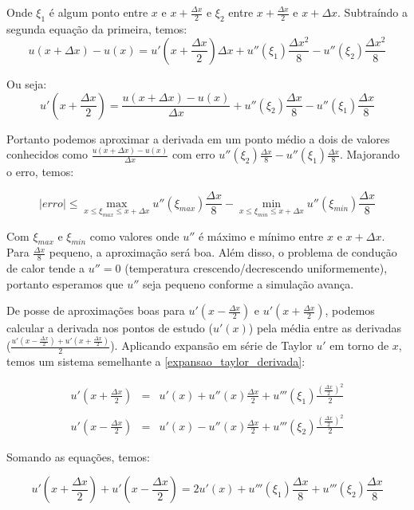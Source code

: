 \documentclass[12pt,fleqn]{article}
\begin{document}
Onde $\xi_1$ é algum ponto entre $x$ e $x + \frac{\Delta x}{2}$ e $\xi_2$ entre $x + \frac{\Delta x}{2}$ e $x + \Delta x$. Subtraíndo a segunda equação da primeira, temos:
\[u(x + \Delta x) - u(x) = u'(x + \frac{\Delta x}{2}) \Delta x + u''(\xi_1) \frac{\Delta x ^ 2}{8} - u''(\xi_2) \frac{\Delta x ^ 2}{8}\]

Ou seja:
\[u'(x + \frac{\Delta x}{2}) = \frac{u(x + \Delta x) - u(x)}{\Delta x} + u''(\xi_2) \frac{\Delta x}{8} - u''(\xi_1) \frac{\Delta x}{8}\]

Portanto podemos aproximar a derivada em um ponto médio a dois de valores conhecidos como $\frac{u(x + \Delta x) - u(x)}{\Delta x}$ com erro $u''(\xi_2) \frac{\Delta x}{8} - u''(\xi_1) \frac{\Delta x}{8}$. Majorando o erro, temos:

\[|erro| \leq \max_{x \leq \xi_{max} \leq x + \Delta x} u''(\xi_{max}) \frac{\Delta x}{8} - \min_{x \leq \xi_{min} \leq x + \Delta x} u''(\xi_{min}) \frac{\Delta x}{8}\]

Com $\xi_{max}$ e $\xi_{min}$ como valores onde $u''$ é máximo e mínimo entre $x$ e $x + \Delta x$. Para $\frac{\Delta x}{8}$ pequeno, a aproximação será boa. Além disso, o problema de condução de calor tende a $u'' = 0$ (temperatura crescendo/decrescendo uniformemente), portanto esperamos que $u''$ seja pequeno conforme a simulação avança.

De posse de aproximações boas para $u'(x - \frac{\Delta x}{2})$ e $u'(x + \frac{\Delta x}{2})$, podemos calcular a derivada nos pontos de estudo ($u'(x)$) pela média entre as derivadas ($\frac{u'(x - \frac{\Delta x}{2}) + u'(x + \frac{\Delta x}{2})}{2}$). Aplicando expansão em série de Taylor $u'$ em torno de $x$, temos um sistema semelhante a \ref{expansao_taylor_derivada}:

\begin{equation}
\label{expansao_taylor_derivada_central}
\begin{array}{rcl}
	u'(x + \frac{\Delta x}{2}) & = & u'(x) + u''(x) \frac{\Delta x}{2} + u'''(\xi_1) \frac{(\frac{\Delta x}{2}) ^ 2}{2} \\ \\
	u'(x - \frac{\Delta x}{2}) & = & u'(x) - u''(x) \frac{\Delta x}{2} + u'''(\xi_2) \frac{(\frac{\Delta x}{2}) ^ 2}{2}
\end{array}
\end{equation}

Somando as equações, temos:

\[
u'(x + \frac{\Delta x}{2}) + u'(x - \frac{\Delta x}{2}) = 2u'(x) + u'''(\xi_1) \frac{\Delta x}{8} + u'''(\xi_2) \frac{\Delta x}{8}
\]
\end{document}
